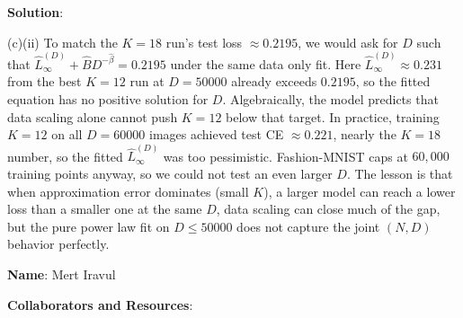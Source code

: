 \documentclass[submit]{../harvardml}
\newenvironment{solution}{
    \vspace{2mm}
    \color{blue}\noindent\textbf{Solution}:
}{}
\begin{document}
\begin{solution}
(c)(ii) To match the $K=18$ run's test loss $\approx 0.2195$, we would ask for $D$ such that $\hat{L}_\infty^{(D)} + \hat{B} D^{-\hat{\beta}} = 0.2195$ under the same data only fit. Here $\hat{L}_\infty^{(D)} \approx 0.231$ from the best $K=12$ run at $D=50000$ already exceeds $0.2195$, so the fitted equation has no positive solution for $D$. Algebraically, the model predicts that data scaling alone cannot push $K=12$ below that target. In practice, training $K=12$ on all $D=60000$ images achieved test CE $\approx 0.221$, nearly the $K=18$ number, so the fitted $\hat{L}_\infty^{(D)}$ was too pessimistic. Fashion-MNIST caps at $60{,}000$ training points anyway, so we could not test an even larger $D$. The lesson is that when approximation error dominates (small $K$), a larger model can reach a lower loss than a smaller one at the same $D$, data scaling can close much of the gap, but the pure power law fit on $D \le 50000$ does not capture the joint $(N,D)$ behavior perfectly.
\end{solution}


\newpage



\textbf{Name}: Mert Iravul

\textbf{Collaborators and Resources}:
\end{document}
